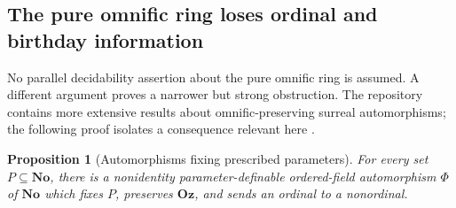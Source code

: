 \documentclass[11pt,letterpaper]{article}
\newtheorem{proposition}[proposition]{Proposition}\aliascntresetthe{proposition}
\theoremstyle{definition}
\theoremstyle{remark}
\newcommand{\No}{\mathbf{No}}
\newcommand{\Oz}{\mathbf{Oz}}
\begin{document}
\subsection{The pure omnific ring loses ordinal and birthday information}

No parallel decidability assertion about the pure omnific ring is assumed. A
different argument proves a narrower but strong obstruction. The repository
contains more extensive results about omnific-preserving surreal automorphisms;
the following proof isolates a consequence relevant here
\cite{ProveItSF13,KKS}.

\begin{proposition}[Automorphisms fixing prescribed parameters]\label{hset:sf:prop:automorphism}
For every set $P\subseteq\No$, there is a nonidentity parameter-definable
ordered-field automorphism $\Phi$ of $\No$ which fixes $P$, preserves $\Oz$, and
sends an ordinal to a nonordinal.
\end{proposition}
\end{document}
